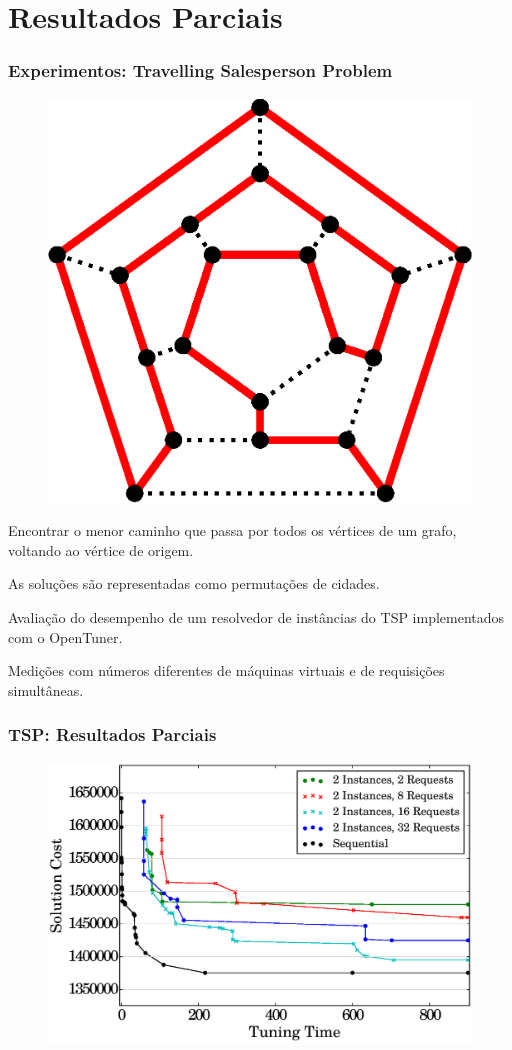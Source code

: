 \documentclass[10pt, compress]{beamer}
\begin{document}
\section{Resultados Parciais}

\begin{frame}[fragile]
    \frametitle{Experimentos: Travelling Salesperson Problem}
    \begin{figure}[H]
        \centering
        \includegraphics[width=.33\textwidth]{hamiltonianpath}
    \end{figure}%
    Encontrar o \alert{menor caminho} que passa por todos os vértices de um
    grafo, \alert{voltando ao vértice de origem}.

    As soluções são representadas como \alert{permutações} de cidades.

    \alert{Avaliação do desempenho} de um resolvedor de
    instâncias do TSP implementados com o OpenTuner. 

    Medições com números diferentes de \alert{máquinas virtuais} e de
    \alert{requisições simultâneas}.
\end{frame}

\begin{frame}[fragile]
  \frametitle{TSP: Resultados Parciais}
  \begin{figure}[H]
      \centering
      \includegraphics[width=.8\textwidth]{i2_p_n_comparison}
  \end{figure}
\end{frame}
\end{document}

